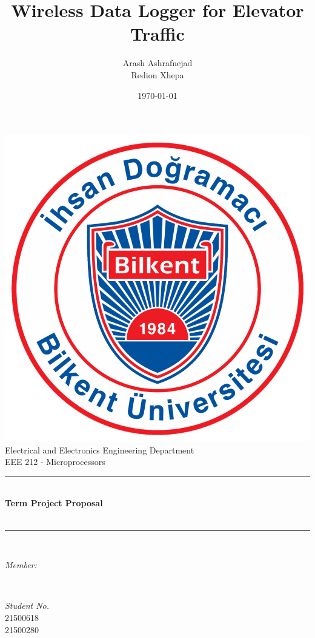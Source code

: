 \documentclass[12pt]{article}
\title{Wireless Data Logger for Elevator Traffic}
\author{Arash Ashrafnejad\\
		Redion Xhepa
		}
\date{\today}
\makeatletter
\let\thetitle\@title
\let\theauthor\@author
\let\thedate\@date
\makeatother
\begin{document}

\begin{titlepage}
	\centering
    \includegraphics[scale = 0.3]{Bilkent.png}\\[0.7 cm]
		    	{\LARGE Electrical and Electronics Engineering Department}\\[0.3cm]	
   	{\LARGE EEE 212 - Microprocessors}\\[0.6 cm]
	\rule{\linewidth}{0.2 mm} \\[0.2 cm]
	{ \LARGE \bfseries Term Project Proposal\\ [0.2 cm]
	 \large \thetitle }\\[0.15 cm]
	\rule{\linewidth}{0.2 mm} \\[1.1 cm]
	
	\begin{minipage}{0.4\textwidth}
		\begin{flushleft} \large
			\emph{Member:}\\
			\theauthor
			\end{flushleft}
			\end{minipage}~
			\begin{minipage}{0.4\textwidth}
			\begin{flushright} \large
			\emph{ Student No.} \\
			21500618\\
			21500280\\
			
		\end{flushright}
	\end{minipage}\\[2 cm]
	
	{\large \thedate}\\[2 cm]
 
	\vfill
	
\end{titlepage}
\end{document}
